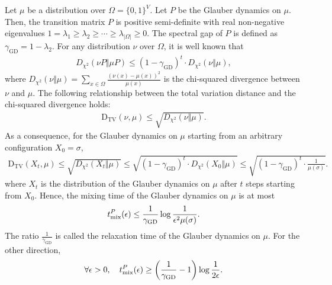 \documentclass[11pt]{amsart}
\newcommand{\tp}[1]{{\left( #1 \right)}}
\def\-#1{\mathrm{#1}}
\newcommand{\DTV}[2]{\-D_{\mathrm{TV}}\left({#1},{#2}\right)}
\theoremstyle{definition}
\theoremstyle{remark}
\begin{document}
Let $\mu$ be a distribution over $\Omega = \{0,1\}^V$. 
Let $P$ be the Glauber dynamics on $\mu$. Then, the transition matrix $P$ is positive semi-definite with real non-negative eigenvalues $1 = \lambda_1 \geq \lambda_2 \geq \cdots \geq \lambda_{|\Omega|} \geq 0$. The spectral gap of $P$ is defined as $\gamma_{\text{GD}} = 1 - \lambda_2$. For any distribution $\nu$ over $\Omega$, it is well known that
\begin{align*}
D_{\chi^2}(\nu P \Vert \mu P) \leq \tp{1 - \gamma_{\text{GD}}}^t \cdot D_{\chi^2}(\nu \Vert \mu),
\end{align*}
where $D_{\chi^2}(\nu \Vert \mu) = \sum_{x \in \Omega} \frac{(\nu(x) - \mu(x))^2}{\mu(x)}$ is the chi-squared divergence between $\nu$ and $\mu$. The following relationship between the total variation distance and the chi-squared divergence holds:
\begin{align*}
\DTV{\nu}{\mu} \leq \sqrt{ D_{\chi^2}(\nu \Vert \mu)}.
\end{align*}
As a consequence, for the Glauber dynamics on $\mu$ starting from an arbitrary configuration $X_0 = \sigma$,
\begin{align*}
\DTV{X_t}{\mu} \leq \sqrt{ D_{\chi^2}(X_t \Vert \mu)} \leq \sqrt{ \tp{1 - \gamma_{\text{GD}}}^t \cdot D_{\chi^2}(X_0 \Vert \mu)} \leq \sqrt{ \tp{1 - \gamma_{\text{GD}}}^t \cdot \frac{1}{\mu(\sigma)}}.
\end{align*}
where $X_t$ is the distribution of the Glauber dynamics on $\mu$ after $t$ steps starting from $X_0$. Hence, the mixing time of the Glauber dynamics on $\mu$ is at most
\begin{align}\label{eq:mixing-time-glauber-gap}
t_{\textnormal{mix}}^P(\epsilon) \leq \frac{1}{\gamma_{\text{GD}}}\log \frac{1}{\epsilon^2 \mu(\sigma)}.
\end{align}
The ratio $\frac{1}{\gamma_{\text{GD}}}$ is called the relaxation time of the Glauber dynamics on $\mu$. For the other direction,
\begin{align}\label{eq:mixing-time-glauber-gap-other-direction}
\forall \epsilon > 0, \quad t_{\textnormal{mix}}^{P}(\epsilon) \geq \tp{\frac{1}{\gamma_{\text{GD}}} - 1} \log \frac{1}{2\epsilon}.
\end{align}
\end{document}
